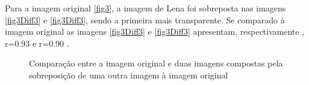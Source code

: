 \documentclass[10pt,a4paper]{article}
\begin{document}
Para a imagem original \ref{fig3}, a imagem de Lena foi sobreposta nas
imagens \ref{fig3Diff3} e \ref{fig3Diff3}, sendo a primeira mais
transparente.
Se comparado à imagem original as imagens \ref{fig3Diff3} e
\ref{fig3Diff3} apresentam, respectivamente , r=0.93 e r=0.90 . 
\begin{figure}[h!]
\begin{center}
\hspace{10mm}
\caption{Comparação entre a imagem original e duas imagens compostas pela sobreposição
  de uma outra imagem à imagem original}
\end{center}
\end{figure}
\end{document}
